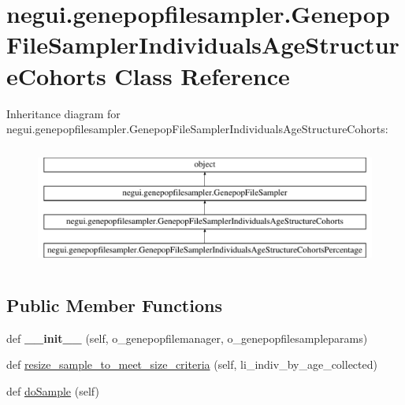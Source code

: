 \hypertarget{classnegui_1_1genepopfilesampler_1_1GenepopFileSamplerIndividualsAgeStructureCohorts}{}\section{negui.\+genepopfilesampler.\+Genepop\+File\+Sampler\+Individuals\+Age\+Structure\+Cohorts Class Reference}
\label{classnegui_1_1genepopfilesampler_1_1GenepopFileSamplerIndividualsAgeStructureCohorts}
Inheritance diagram for negui.\+genepopfilesampler.\+Genepop\+File\+Sampler\+Individuals\+Age\+Structure\+Cohorts\+:\begin{figure}[H]
\begin{center}
\leavevmode
\includegraphics[height=4.000000cm]{classnegui_1_1genepopfilesampler_1_1GenepopFileSamplerIndividualsAgeStructureCohorts}
\end{center}
\end{figure}
\subsection*{Public Member Functions}
\begin{DoxyCompactItemize}
\item 
def {\bfseries \+\_\+\+\_\+init\+\_\+\+\_\+} (self, o\+\_\+genepopfilemanager, o\+\_\+genepopfilesampleparams)\hypertarget{classnegui_1_1genepopfilesampler_1_1GenepopFileSamplerIndividualsAgeStructureCohorts_ab997e641e99278377a07624ad847a697}{}\label{classnegui_1_1genepopfilesampler_1_1GenepopFileSamplerIndividualsAgeStructureCohorts_ab997e641e99278377a07624ad847a697}

\item 
def \hyperlink{classnegui_1_1genepopfilesampler_1_1GenepopFileSamplerIndividualsAgeStructureCohorts_a28deaac6347b19f565b2a50f233a6f06}{resize\+\_\+sample\+\_\+to\+\_\+meet\+\_\+size\+\_\+criteria} (self, li\+\_\+indiv\+\_\+by\+\_\+age\+\_\+collected)
\item 
def \hyperlink{classnegui_1_1genepopfilesampler_1_1GenepopFileSamplerIndividualsAgeStructureCohorts_a50e96ddae763e7e8dba2ac37fa0c6ce5}{do\+Sample} (self)
\end{DoxyCompactItemize}


